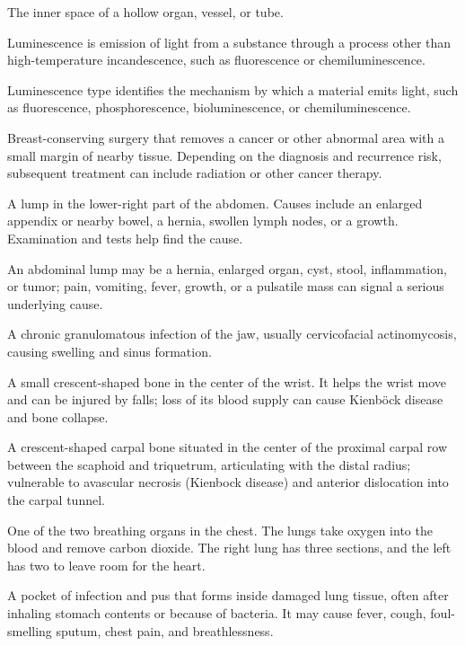  The inner space of a hollow organ, vessel, or tube.

 Luminescence is emission of light from a substance through a process other than high-temperature incandescence, such as fluorescence or chemiluminescence.

 Luminescence type identifies the mechanism by which a material emits light, such as fluorescence, phosphorescence, bioluminescence, or chemiluminescence.

 Breast-conserving surgery that removes a cancer or other abnormal area with a small margin of nearby tissue. Depending on the diagnosis and recurrence risk, subsequent treatment can include radiation or other cancer therapy.

 A lump in the lower-right part of the abdomen. Causes include an enlarged appendix or nearby bowel, a hernia, swollen lymph nodes, or a growth. Examination and tests help find the cause.

 An abdominal lump may be a hernia, enlarged organ, cyst, stool, inflammation, or tumor; pain, vomiting, fever, growth, or a pulsatile mass can signal a serious underlying cause.

 A chronic granulomatous infection of the jaw, usually cervicofacial actinomycosis, causing swelling and sinus formation.

 A small crescent-shaped bone in the center of the wrist. It helps the wrist move and can be injured by falls; loss of its blood supply can cause Kienböck disease and bone collapse.

 A crescent-shaped carpal bone situated in the center of the proximal carpal row between the scaphoid and triquetrum, articulating with the distal radius; vulnerable to avascular necrosis (Kienbock disease) and anterior dislocation into the carpal tunnel.

 One of the two breathing organs in the chest. The lungs take oxygen into the blood and remove carbon dioxide. The right lung has three sections, and the left has two to leave room for the heart.

 A pocket of infection and pus that forms inside damaged lung tissue, often after inhaling stomach contents or because of bacteria. It may cause fever, cough, foul-smelling sputum, chest pain, and breathlessness.

